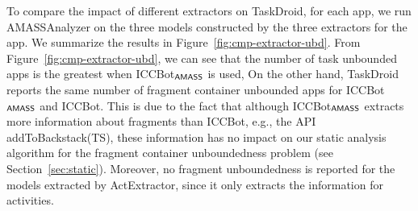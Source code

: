 To compare the impact of different extractors on TaskDroid, for each app, we run {\sf AMASSAnalyzer} on the three models constructed by the three extractors for the app. We summarize the results in Figure~\ref{fig:cmp-extractor-ubd}. From Figure~\ref{fig:cmp-extractor-ubd}, we can see that the number of task unbounded apps is the greatest when ICCBot$_{\textsf{AMASS}}$ is used, 
On the other hand, TaskDroid reports the same number of fragment container unbounded apps for ICCBot$_{\textsf{AMASS}}$ and ICCBot. This is due to the fact that although ICCBot$_{\textsf{AMASS}}$ extracts more information about fragments than ICCBot, e.g., the API addToBackstack(TS), these information has no impact on our static analysis algorithm for the fragment container unboundedness problem (see Section~\ref{sec:static}). Moreover, no fragment unboundedness is reported for the models extracted by ActExtractor, since it only extracts the information for activities. 



